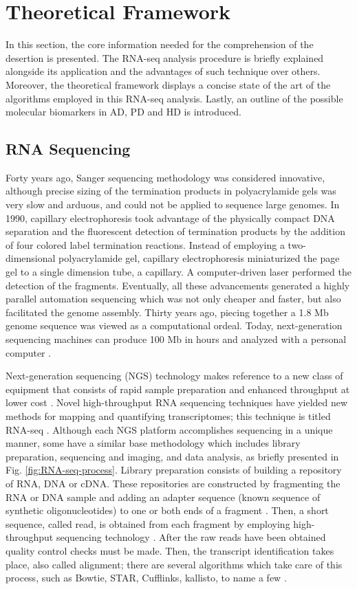 \chapter{Theoretical Framework}
\label{chapter:TF}

In this section, the core information needed for the comprehension of the desertion is presented. The RNA-seq analysis procedure is briefly explained alongside its application and the advantages of such technique over others. Moreover, the theoretical framework displays a concise state of the art of the algorithms employed in this RNA-seq analysis. Lastly, an outline of the possible molecular biomarkers in AD, PD and HD is introduced.

\section{RNA Sequencing} \label{rna-seq}

Forty years ago, Sanger sequencing methodology was considered innovative, although precise sizing of the termination products in polyacrylamide gels was very slow and arduous, and could not be applied to sequence large genomes. In 1990, capillary electrophoresis took advantage of the physically compact DNA separation and the fluorescent detection of termination products by the addition of four colored label termination reactions. Instead of employing a two-dimensional polyacrylamide gel, capillary electrophoresis miniaturized the page gel to a single dimension tube, a capillary. A computer-driven laser performed the detection of the fragments. Eventually, all these advancements generated a highly parallel automation sequencing which was not only cheaper and faster, but also facilitated the genome assembly. Thirty years ago, piecing together a 1.8 Mb genome sequence was viewed as a computational ordeal. Today, next-generation sequencing machines can produce 100 Mb in hours and analyzed with a personal computer \cite{Chapter1}.

Next-generation sequencing (NGS) technology makes reference to a new class of equipment that consists of rapid sample preparation and enhanced throughput at lower cost \cite{Lei2008}. Novel high-throughput RNA sequencing techniques have yielded new methods for mapping and quantifying transcriptomes; this technique is titled RNA-seq \cite{Wang}. Although each NGS platform accomplishes sequencing in a unique manner, some have a similar base methodology which includes library preparation, sequencing and imaging, and data analysis, as briefly presented in Fig. \ref{fig:RNA-seq-process}. Library preparation consists of building a repository of RNA, DNA or cDNA. These repositories are constructed by fragmenting the RNA or DNA sample and adding an adapter sequence (known sequence of synthetic oligonucleotides) to one or both ends of a fragment \cite{Grada}. Then, a short sequence, called read, is obtained from each fragment by employing high-throughput sequencing technology \cite{Wang}. After the raw reads have been obtained quality control checks must be made. Then, the transcript identification takes place, also called alignment; there are several algorithms which take care of this process, such as Bowtie, STAR, Cufflinks, kallisto, to name a few \cite{Conesa2016}.

